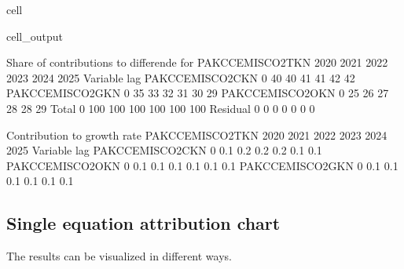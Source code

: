 \documentclass[letterpaper,10pt,english]{jupyterBook}
\begin{document}
\begin{sphinxuseclass}{cell}
\begin{sphinxVerbatimOutput}
\begin{sphinxuseclass}{cell_output}
\begin{sphinxVerbatim}[commandchars=\\\{\}]
 Share of contributions to differende for  PAKCCEMISCO2TKN
                           2020        2021        2022        2023        2024        2025
Variable        lag                                                                        
PAKCCEMISCO2CKN 0           40\PYGZpc{}         40\PYGZpc{}         41\PYGZpc{}         41\PYGZpc{}         42\PYGZpc{}         42\PYGZpc{}
PAKCCEMISCO2GKN 0           35\PYGZpc{}         33\PYGZpc{}         32\PYGZpc{}         31\PYGZpc{}         30\PYGZpc{}         29\PYGZpc{}
PAKCCEMISCO2OKN 0           25\PYGZpc{}         26\PYGZpc{}         27\PYGZpc{}         28\PYGZpc{}         28\PYGZpc{}         29\PYGZpc{}
Total           0          100\PYGZpc{}        100\PYGZpc{}        100\PYGZpc{}        100\PYGZpc{}        100\PYGZpc{}        100\PYGZpc{}
Residual        0            0\PYGZpc{}          0\PYGZpc{}          0\PYGZpc{}          0\PYGZpc{}          0\PYGZpc{}          0\PYGZpc{}

 Contribution to growth rate PAKCCEMISCO2TKN
                           2020        2021        2022        2023        2024        2025
Variable        lag                                                                        
PAKCCEMISCO2CKN 0         \PYGZhy{}0.1\PYGZpc{}       \PYGZhy{}0.2\PYGZpc{}       \PYGZhy{}0.2\PYGZpc{}       \PYGZhy{}0.2\PYGZpc{}       \PYGZhy{}0.1\PYGZpc{}       \PYGZhy{}0.1\PYGZpc{}
PAKCCEMISCO2OKN 0         \PYGZhy{}0.1\PYGZpc{}       \PYGZhy{}0.1\PYGZpc{}       \PYGZhy{}0.1\PYGZpc{}       \PYGZhy{}0.1\PYGZpc{}       \PYGZhy{}0.1\PYGZpc{}       \PYGZhy{}0.1\PYGZpc{}
PAKCCEMISCO2GKN 0         \PYGZhy{}0.1\PYGZpc{}       \PYGZhy{}0.1\PYGZpc{}       \PYGZhy{}0.1\PYGZpc{}       \PYGZhy{}0.1\PYGZpc{}       \PYGZhy{}0.1\PYGZpc{}       \PYGZhy{}0.1\PYGZpc{}
\end{sphinxVerbatim}

\end{sphinxuseclass}\end{sphinxVerbatimOutput}

\end{sphinxuseclass}

\subsection{Single equation attribution chart}
\label{\detokenize{content/howto/attribution/Attribution background:single-equation-attribution-chart}}
\sphinxAtStartPar
The results can be visualized in different ways.
\end{document}
